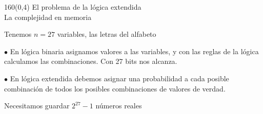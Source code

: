 \documentclass[shownotes,aspectratio=169]{beamer}
\begin{document}
\begin{frame}[plain]
\begin{textblock}{160}(0,4)
 \centering \LARGE El problema de la lógica extendida \\
 \large La complejidad en memoria
 \end{textblock}
 \vspace{1.5cm}

 Tenemos $n=27$ variables, las letras del alfabeto \\

 \pause

 \vspace{0.5cm}

 $\bullet$ En lógica binaria asignamos valores a las variables, y con las reglas de la lógica calculamos las combinaciones. \pause Con 27 bits nos alcanza.  \\

 \vspace{0.5cm}

 \pause

 $\bullet$ En lógica extendida debemos asignar una probabilidad a cada posible combinación de todos los posibles combinaciones de valores de verdad.  \\

 \vspace{0.2cm}
  \pause

  Necesitamos guardar $2^{27}-1$ números reales  \\[0.2cm]

\end{frame}
\end{document}
